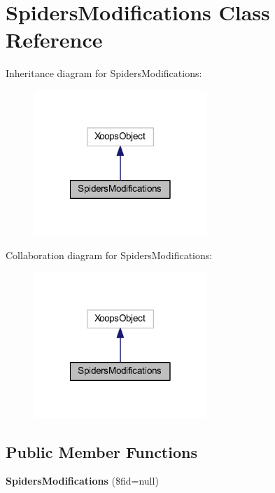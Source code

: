 \hypertarget{class_spiders_modifications}{\section{Spiders\-Modifications Class Reference}
\label{class_spiders_modifications}
}


Inheritance diagram for Spiders\-Modifications\-:
\nopagebreak
\begin{figure}[H]
\begin{center}
\leavevmode
\includegraphics[width=186pt]{class_spiders_modifications__inherit__graph}
\end{center}
\end{figure}


Collaboration diagram for Spiders\-Modifications\-:
\nopagebreak
\begin{figure}[H]
\begin{center}
\leavevmode
\includegraphics[width=186pt]{class_spiders_modifications__coll__graph}
\end{center}
\end{figure}
\subsection*{Public Member Functions}
\begin{DoxyCompactItemize}
\item 
\hypertarget{class_spiders_modifications_a5b1e3503d01aff3835e1c3cbaef80a11}{{\bfseries Spiders\-Modifications} (\$fid=null)}\label{class_spiders_modifications_a5b1e3503d01aff3835e1c3cbaef80a11}

\end{DoxyCompactItemize}


